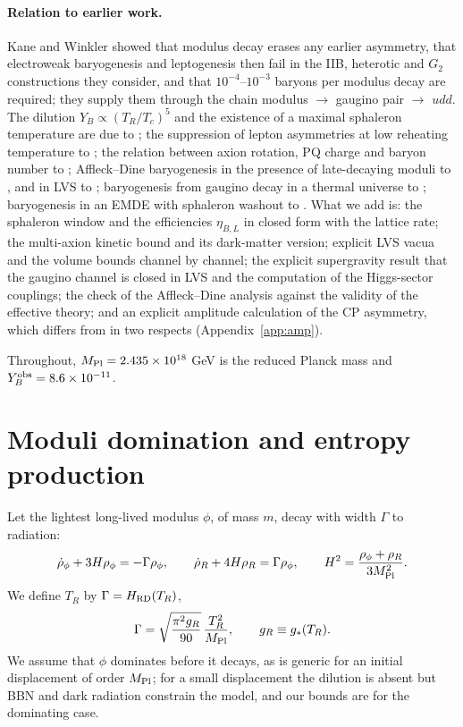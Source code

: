 \documentclass[11pt]{article}
\newcommand{\Mpl}{M_{\rm Pl}}
\begin{document}
\paragraph*{Relation to earlier work.}
Kane and Winkler \cite{KW} showed that modulus decay erases any earlier asymmetry, that electroweak baryogenesis and leptogenesis then fail in the IIB, heterotic and $G_2$ constructions they consider, and that $10^{-4}$--$10^{-3}$ baryons per modulus decay are required; they supply them through the chain modulus $\to$ gaugino pair $\to$ $udd$. The dilution $Y_B\propto(T_R/T_c)^5$ and the existence of a maximal sphaleron temperature are due to \cite{DLR,McDonald}; the suppression of lepton asymmetries at low reheating temperature to \cite{Garcia}; the relation between axion rotation, PQ charge and baryon number to \cite{CoHarigaya,Snowmass,Asadi}; Affleck--Dine baryogenesis in the presence of late-decaying moduli to \cite{ADS,KN,KSWY}, and in LVS to \cite{HKT1}; baryogenesis from gaugino decay in a thermal universe to \cite{Cui,ACN}; baryogenesis in an EMDE with sphaleron washout to \cite{Haghi}. What we add is: the sphaleron window and the efficiencies $\eta_{B,L}$ in closed form with the lattice rate; the multi-axion kinetic bound and its dark-matter version; explicit LVS vacua and the volume bounds channel by channel; the explicit supergravity result that the gaugino channel is closed in LVS and the computation of the Higgs-sector couplings; the check of the Affleck--Dine analysis against the validity of the effective theory; and an explicit amplitude calculation of the CP asymmetry, which differs from \cite{KW} in two respects (Appendix~\ref{app:amp}).

Throughout, $\Mpl=2.435\times10^{18}$ GeV is the reduced Planck mass and $Y_B^{\rm obs}=8.6\times10^{-11}$.

\section{Moduli domination and entropy production}\label{sec:emde}

Let the lightest long-lived modulus $\phi$, of mass $m$, decay with width $\Gamma$ to radiation:
\begin{equation}
\dot\rho_\phi+3H\rho_\phi=-\Gamma\rho_\phi,\qquad \dot\rho_R+4H\rho_R=\Gamma\rho_\phi,\qquad H^2=\frac{\rho_\phi+\rho_R}{3\Mpl^2}.
\label{eq:boltz}
\end{equation}
We define $T_R$ by $\Gamma=H_{\rm RD}(T_R)$,
\begin{equation}
\Gamma=\sqrt{\frac{\pi^2 g_R}{90}}\,\frac{T_R^2}{\Mpl},\qquad g_R\equiv g_*(T_R).
\label{eq:TR}
\end{equation}
We assume that $\phi$ dominates before it decays, as is generic for an initial displacement of order $\Mpl$; for a small displacement the dilution is absent but BBN and dark radiation constrain the model, and our bounds are for the dominating case.
\end{document}
